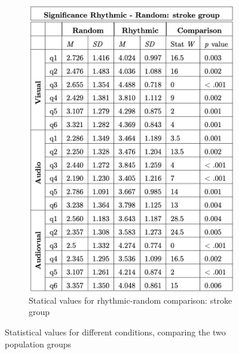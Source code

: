 \begin{figure}[htbp]
\begin{subfigure}[htbp]{0.33\textwidth}
        \includegraphics[width=\textwidth]{significance_tables/stroke_group.png}
        \caption{Statical values for rhythmic-random comparison: stroke group}
        \label{fig: significance rhythmic-random stroke} 
    \end{subfigure} 
    \caption{Statistical values for different conditions, comparing the two population groups}
    \label{fig: significance rhythmic-random}
\end{figure}

